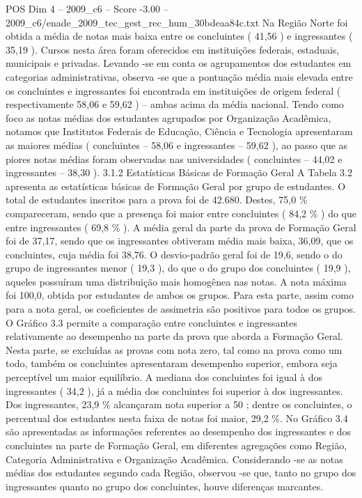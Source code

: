 \begin{textsample}{POS Dim 4 – 2009\_c6 – Score -3.00 – 2009\_c6/enade\_2009\_tec\_gest\_rec\_hum\_30bdeaa84c.txt}
Na Região Norte foi obtida a média de notas mais baixa entre os concluintes ( 41,56 ) e ingressantes ( 35,19 ).
Cursos nesta área foram oferecidos em instituições federais, estaduais, municipais e privadas.
Levando -se em conta os agrupamentos dos estudantes em categorias administrativas, observa -se que a pontuação média mais elevada entre os concluintes e ingressantes foi encontrada em instituições de origem federal ( respectivamente 58,06 e 59,62 ) – ambas acima da média nacional.
Tendo como foco as notas médias dos estudantes agrupados por Organização Acadêmica, notamos que Institutos Federais de Educação, Ciência e Tecnologia apresentaram as maiores médias ( concluintes – 58,06 e ingressantes – 59,62 ), ao passo que as piores notas médias foram observadas nas universidades ( concluintes – 44,02 e ingressantes – 38,30 ). 3.1.2 Estatísticas Básicas de Formação Geral A Tabela 3.2 apresenta as estatísticas básicas de Formação Geral por grupo de estudantes.
O total de estudantes inscritos para a prova foi de 42.680.
Destes, 75,0 \% compareceram, sendo que a presença foi maior entre concluintes ( 84,2 \% ) do que entre ingressantes ( 69,8 \% ).
A média geral da parte da prova de Formação Geral foi de 37,17, sendo que os ingressantes obtiveram média mais baixa, 36,09, que os concluintes, cuja média foi 38,76.
O desvio-padrão geral foi de 19,6, sendo o do grupo de ingressantes menor ( 19,3 ), do que o do grupo dos concluintes ( 19,9 ), aqueles possuíram uma distribuição mais homogênea nas notas.
A nota máxima foi 100,0, obtida por estudantes de ambos os grupos.
Para esta parte, assim como para a nota geral, os coeficientes de assimetria são positivos para todos os grupos.
O Gráfico 3.3 permite a comparação entre concluintes e ingressantes relativamente ao desempenho na parte da prova que aborda a Formação Geral.
Nesta parte, se excluídas as provas com nota zero, tal como na prova como um todo, também os concluintes apresentaram desempenho superior, embora seja perceptível um maior equilíbrio.
A mediana dos concluintes foi igual à dos ingressantes ( 34,2 ), já a média dos concluintes foi superior à dos ingressantes.
Dos ingressantes, 23,9 \% alcançaram nota superior a 50 ; dentre os concluintes, o percentual dos estudantes nesta faixa de notas foi maior, 29,2 \%.
No Gráfico 3.4 são apresentadas as informações referentes ao desempenho dos ingressantes e dos concluintes na parte de Formação Geral, em diferentes agregações como Região, Categoria Administrativa e Organização Acadêmica.
Considerando -se as notas médias dos estudantes segundo cada Região, observou -se que, tanto no grupo dos ingressantes quanto no grupo dos concluintes, houve diferenças marcantes.

\end{textsample}
